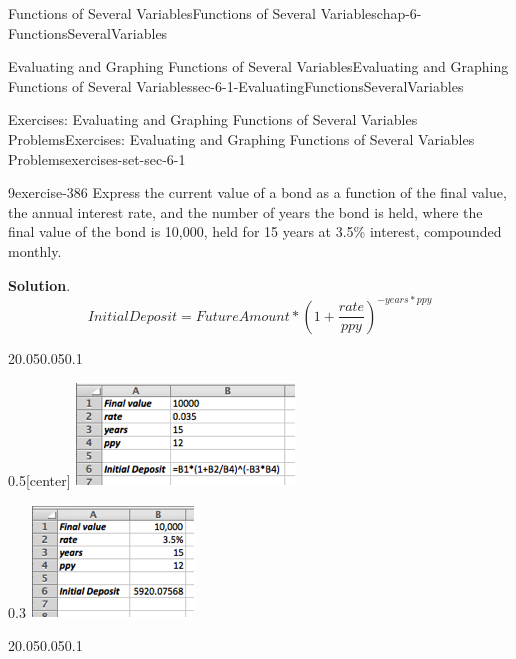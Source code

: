 \documentclass[oneside,10pt,]{book}
\numberwithin{equation}{section}
\begin{document}
\begin{chapterptx}{Functions of Several Variables}{}{Functions of Several Variables}{}{}{chap-6-FunctionsSeveralVariables}
\begin{sectionptx}{Evaluating and Graphing Functions of Several Variables}{}{Evaluating and Graphing Functions of Several Variables}{}{}{sec-6-1-EvaluatingFunctionsSeveralVariables}
\begin{exercises-subsection-numberless}{Exercises: Evaluating and Graphing Functions of Several Variables Problems}{}{Exercises: Evaluating and Graphing Functions of Several Variables Problems}{}{}{exercises-set-sec-6-1}
\begin{exercisegroup}
\begin{divisionexerciseeg}{9}{}{}{exercise-386}
\hypertarget{p-2178}{}%
Express the current value of a bond as a function of the final value, the annual interest rate, and the number of years the bond is held, where the final value of the bond is \textdollar{}10,000, held for 15 years at 3.5\% interest, compounded monthly.%
\par\smallskip%
\noindent\textbf{Solution}.\hypertarget{solution-194}{}\quad%
%
\begin{equation*}
InitialDeposit=FutureAmount*\left(1+\frac{rate}{ppy}\right)^{-years*ppy}
\end{equation*}
\begin{sidebyside}{2}{0.05}{0.05}{0.1}%
\begin{sbspanel}{0.5}[center]%
\includegraphics[width=1\linewidth]{images/sec6-1-sol9a.png}
\end{sbspanel}%
\begin{sbspanel}{0.3}%
\includegraphics[width=1\linewidth]{images/sec6-1-sol9b.png}
\end{sbspanel}%
\end{sidebyside}%
\begin{sidebyside}{2}{0.05}{0.05}{0.1}%

\end{sidebyside}
\end{divisionexerciseeg}
\end{exercisegroup}
\end{exercises-subsection-numberless}
\end{sectionptx}
\end{chapterptx}
\end{document}
